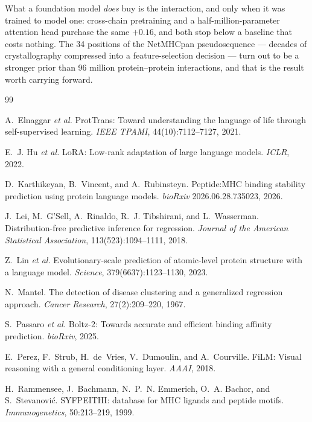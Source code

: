 \documentclass[11pt,a4paper]{article}
\begin{document}
What a foundation model \emph{does} buy is the interaction, and only when it was trained to model
one: cross-chain pretraining and a half-million-parameter attention head purchase the same
$+0.16$, and both stop below a baseline that costs nothing. The 34 positions of the NetMHCpan
pseudosequence --- decades of crystallography compressed into a feature-selection decision --- turn
out to be a stronger prior than 96 million protein--protein interactions, and that is the result
worth carrying forward.

\begin{thebibliography}{99}\small

A.~Elnaggar \emph{et al.}
\newblock ProtTrans: Toward understanding the language of life through self-supervised learning.
\newblock \emph{IEEE TPAMI}, 44(10):7112--7127, 2021.

E.~J. Hu \emph{et al.}
\newblock LoRA: Low-rank adaptation of large language models.
\newblock \emph{ICLR}, 2022.

D.~Karthikeyan, B.~Vincent, and A.~Rubinsteyn.
\newblock Peptide:MHC binding stability prediction using protein language models.
\newblock \emph{bioRxiv} 2026.06.28.735023, 2026.

J.~Lei, M.~G'Sell, A.~Rinaldo, R.~J. Tibshirani, and L.~Wasserman.
\newblock Distribution-free predictive inference for regression.
\newblock \emph{Journal of the American Statistical Association}, 113(523):1094--1111, 2018.

Z.~Lin \emph{et al.}
\newblock Evolutionary-scale prediction of atomic-level protein structure with a language model.
\newblock \emph{Science}, 379(6637):1123--1130, 2023.

N.~Mantel.
\newblock The detection of disease clustering and a generalized regression approach.
\newblock \emph{Cancer Research}, 27(2):209--220, 1967.

S.~Passaro \emph{et al.}
\newblock Boltz-2: Towards accurate and efficient binding affinity prediction.
\newblock \emph{bioRxiv}, 2025.

E.~Perez, F.~Strub, H.~de~Vries, V.~Dumoulin, and A.~Courville.
\newblock FiLM: Visual reasoning with a general conditioning layer.
\newblock \emph{AAAI}, 2018.

H.~Rammensee, J.~Bachmann, N.~P.~N. Emmerich, O.~A. Bachor, and S.~Stevanovi\'c.
\newblock SYFPEITHI: database for MHC ligands and peptide motifs.
\newblock \emph{Immunogenetics}, 50:213--219, 1999.


\end{thebibliography}
\end{document}
